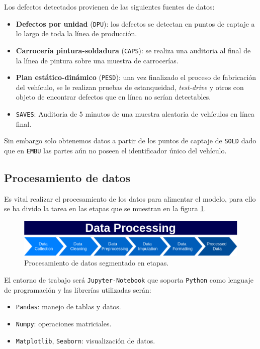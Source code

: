 \documentclass[a4paper,12pt]{article}
\begin{document}
Los defectos detectados provienen de las siguientes fuentes de datos:
\begin{itemize}
	\item \textbf{Defectos por unidad} (\texttt{DPU}): los defectos se detectan en puntos de captaje a lo largo de toda la línea de producción.
	\item \textbf{Carrocería pintura-soldadura} (\texttt{CAPS}): se realiza una auditoria al final de la línea de pintura sobre una muestra de carrocerías.
	\item \textbf{Plan estático-dinámico} (\texttt{PESD}): una vez finalizado el proceso de fabricación del vehículo, se le realizan pruebas de estanqueidad, \textit{test-drive} y otros con objeto de encontrar defectos que en línea no serían detectables.
	\item \texttt{SAVES}: Auditoria de 5 minutos de una muestra aleatoria de vehículos en línea final.
\end{itemize}

Sin embargo solo obtenemos datos a partir de los puntos de captaje de \texttt{SOLD} dado que en \texttt{EMBU} las partes aún no poseen el identificador único del vehículo.

\subsection{Procesamiento de datos}

Es vital realizar el procesamiento de los datos para alimentar el modelo, para ello se ha divido la tarea en las etapas que se muestran en la figura \ref{fig:dataproc}.

\begin{figure}[H]
	\begin{center}				
	\includegraphics[width=1\textwidth]{dataproc.png}
  	\caption{Procesamiento de datos segmentado en etapas.}
  	\label{fig:dataproc}
  	\end{center}
\end{figure}

El entorno de trabajo será \texttt{Jupyter-Notebook} que soporta \texttt{Python} como lenguaje de programación y las librerías utilizadas serán: 
\begin{itemize}
	\item \texttt{Pandas}: manejo de tablas y datos.
	\item \texttt{Numpy}: operaciones matriciales.
	\item \texttt{Matplotlib}, \texttt{Seaborn}: visualización de datos.
\end{itemize}
\end{document}
